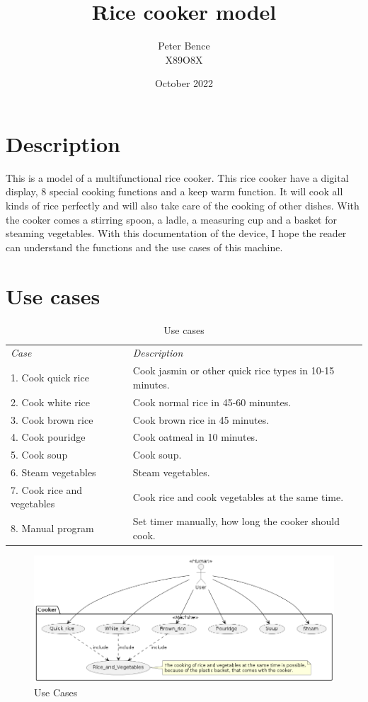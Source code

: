 \documentclass{scrartcl}
\title{Rice cooker model}
\author{Peter Bence\\X89O8X}
\date{October 2022}
\begin{document}
\maketitle
\newpage

\tableofcontents
\newpage

\section{Description}
This is a model of a multifunctional rice cooker. This rice cooker have a digital display, 8 special cooking functions and a keep warm function. It will cook all kinds of rice perfectly and will also take care of the cooking of other dishes. With the cooker comes a stirring spoon, a ladle, a measuring cup and a basket for steaming vegetables. With this documentation of the device, I hope the reader can understand the functions and the use cases of this machine.

\section{Use cases}
\begin{table}[H] \centering
    \caption{Use cases}\label{tab:usecasetable}
    \begin{tabular}{@{}ll@{}} \hline
        \emph{Case} & \emph{Description}\\
        1. Cook quick rice & Cook jasmin or other quick rice types in 10-15 minutes.\\
        2. Cook white rice & Cook normal rice in 45-60 minuntes.\\
        3. Cook brown rice & Cook brown rice in 45 minutes.\\
        4. Cook pouridge & Cook oatmeal in 10 minutes.\\
        5. Cook soup & Cook soup.\\
        6. Steam vegetables & Steam vegetables.\\
        7. Cook rice and vegetables & Cook rice and cook vegetables at the same time.\\
        8. Manual program & Set timer manually, how long the cooker should cook.
    \end{tabular}
\end{table}
\begin{figure}[H]\centering
    \includegraphics[width=1.1\columnwidth]{UseCase.png}
    \caption{Use Cases}\label{fig:1}
\end{figure}
\end{document}
